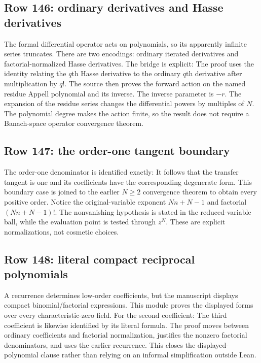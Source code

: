 \subsection{Row 146: ordinary derivatives and Hasse derivatives}
The formal differential operator acts on polynomials, so its apparently infinite series truncates. There are two encodings: ordinary iterated derivatives and factorial-normalized Hasse derivatives. The bridge is explicit:
The proof uses the identity relating the $q$th Hasse derivative to the ordinary $q$th derivative after multiplication by $q!$. The source then proves the forward action on the named residue Appell polynomial and its inverse.
The inverse parameter is $-r$. The expansion of the residue series changes the differential powers by multiples of $N$. The polynomial degree makes the action finite, so the result does not require a Banach-space operator convergence theorem.

\subsection{Row 147: the order-one tangent boundary}
The order-one denominator is identified exactly:
It follows that the transfer tangent is one and its coefficients have the corresponding degenerate form. This boundary case is joined to the earlier $N\geq2$ convergence theorem to obtain every positive order.
Notice the original-variable exponent $Nn+N-1$ and factorial $(Nn+N-1)!$. The nonvanishing hypothesis is stated in the reduced-variable ball, while the evaluation point is tested through $z^N$. These are explicit normalizations, not cosmetic choices.

\subsection{Row 148: literal compact reciprocal polynomials}
A recurrence determines low-order coefficients, but the manuscript displays compact binomial/factorial expressions. This module proves the displayed forms over every characteristic-zero field. For the second coefficient:
The third coefficient is likewise identified by its literal formula. The proof moves between ordinary coefficients and factorial normalization, justifies the nonzero factorial denominators, and uses the earlier recurrence. This closes the displayed-polynomial clause rather than relying on an informal simplification outside Lean.

